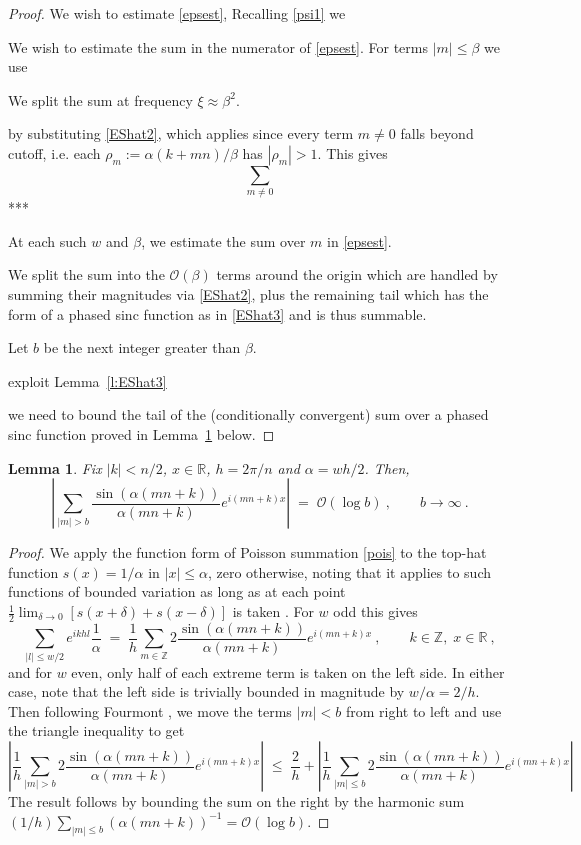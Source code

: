 \documentclass[10pt]{article}
\newcommand{\be}{\begin{equation}}
\newcommand{\ee}{\end{equation}}
\newcommand{\RR}{\mathbb{R}}
\newcommand{\ZZ}{\mathbb{Z}}
\newcommand{\bigO}{{\mathcal O}}
\newtheorem{lem}[thm]{Lemma}
\newcommand{\freq}{\beta}          %
\newcommand{\al}{\alpha}           %
\begin{document}
\begin{proof}
  We wish to estimate \eqref{epsest}, 
  Recalling \eqref{psi1} we 
  
  We wish to estimate the sum in the numerator of \eqref{epsest}.
  For terms $|m|\le \freq$ we use 

  We split the sum at frequency $\xi \approx \freq^2$.
  
  by substituting \eqref{EShat2}, which applies since every term $m\neq 0$
  falls beyond cutoff, i.e. each $\rho_m := \al(k+mn)/\beta$ has $|\rho_m|>1$.
  This gives
  $$
  \sum_{m\neq 0} 
$$
***
  
At each such $w$ and $\freq$, we estimate the sum over $m$ in \eqref{epsest}.



  
  We split the sum into the $\bigO(\freq)$ terms around the origin
  which are handled by summing their magnitudes via \eqref{EShat2},
  plus the remaining tail which has the form of a phased sinc function
  as in \eqref{EShat3} and is thus summable.
  
  Let $b$ be the next integer greater than $\freq$.
  
 exploit Lemma~\ref{l:EShat3}
  
we need to bound the tail of the (conditionally convergent) sum over a phased sinc function proved in Lemma~\ref{l:Fourmont} below.
  
  \end{proof}


\begin{lem}
  Fix $|k|<n/2$, $x\in\RR$, $h=2\pi/n$ and $\al=wh/2$. Then,
  \be
  \left|
  \sum_{|m|>b} \frac{\sin (\al (mn+k))}{\al (mn+k)} e^{i(mn+k)x}
  \right|
  \; = \; \bigO(\log b)~, \qquad b\to \infty ~.
\ee
\label{l:Fourmont}
\end{lem}
\begin{proof}
  We apply the function form of Poisson summation \eqref{pois} to
  the top-hat function $s(x) = 1/\al$ in $|x|\le \al$, zero otherwise,
  noting that it applies to such functions of bounded variation
  as long as at each
  point $\frac{1}{2}\lim_{\delta\to0} [s(x+\delta) + s(x-\delta)]$ is taken
  \cite[\S 11.22]{apostol}.
  For $w$ odd this gives
  $$
  \sum_{|l|\le w/2} e^{ikhl} \frac{1}{\al}
  \;=\;
  \frac{1}{h} \sum_{m\in\ZZ} 2 \frac{\sin (\al (mn+k))}{\al (mn+k)} e^{i(mn+k)x}
  ~,\qquad k\in\ZZ, \; x\in\RR~,
  $$
  and for $w$ even, only half of each extreme term is taken on the left side.
  In either case, note that the left side is
  trivially bounded in magnitude by $w/\al = 2/h$.
  Then following Fourmont \cite[Lemma~2.5.4]{fourmontthesis},
  we move the terms $|m|<b$ from right to left and use the triangle inequality
  to get
  $$
  \left|
  \frac{1}{h} \sum_{|m|> b} 2 \frac{\sin (\al (mn+k))}{\al (mn+k)} e^{i(mn+k)x}
  \right|
  \; \le \; \frac{2}{h} +
  \left|
  \frac{1}{h} \sum_{|m|\le b} 2 \frac{\sin (\al (mn+k))}{\al (mn+k)} e^{i(mn+k)x}
  \right|
   $$
  The result follows by bounding the sum on the right by the
  harmonic sum $(1/h) \sum_{|m|\le b} (\al(mn+k))^{-1} = \bigO(\log b)$.
\end{proof}
\end{document}
